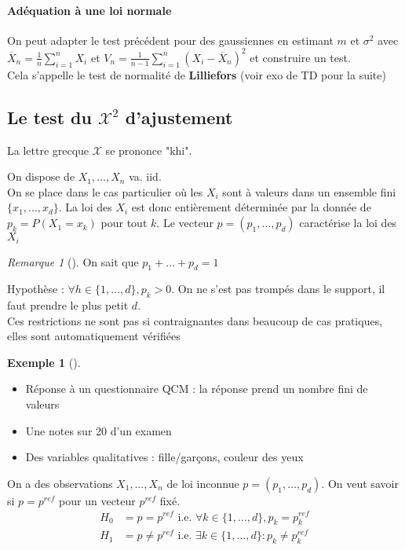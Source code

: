 \documentclass{article}
\theoremstyle{plain}%
\theoremstyle{definition}
\newtheorem{exmp}{Exemple}[section]
\theoremstyle{remark}
\newtheorem*{rem}{Remarque}
\begin{document}
\paragraph{Adéquation à une loi normale}
On peut adapter le test précédent pour des gaussiennes en estimant $ m $ et $ \sigma ^2 $ avec $ \overline{X}_n = \frac{1}{n}\sum_{i=1}^{n}X_i $ et $ V_n = \frac{1}{n-1} \sum_{i=1}^{n}(X_i - \overline{X}_n)^2 $ et construire un test. \\
Cela s'appelle le test de normalité de \textbf{Lilliefors} (voir exo de TD pour la suite)

\subsection{Le test du $ \mathcal{X}^2 $ d'ajustement}
La lettre grecque $ \mathcal{X} $ se prononce "khi". 

On dispose de $ X_1, \dots, X_n $ va. iid. \\
On se place dans le cas particulier où les $ X_i $ sont à valeurs dans un ensemble fini $ \{x_1, \dots, x_d\} $. La loi des $ X_i $ est donc entièrement déterminée par la donnée de $ p_k = P(X_1 = x_k) $ pour tout $ k $. Le vecteur $ p=(p_1, \dots, p_d) $ caractérise la loi des $ X_i $ 
\begin{rem}[]
    On sait que $ p_1 + \dots + p_d = 1 $
\end{rem}
Hypothèse : $ \forall h \in \{1,\dots,d\}, p_k > 0$. On ne s'est pas trompés dans le support, il faut prendre le plus petit $ d $. \\
Ces restrictions ne sont pas si contraignantes dans beaucoup de cas pratiques, elles sont automatiquement vérifiées

\begin{exmp}[]
    \begin{itemize}
        \item Réponse à un questionnaire QCM : la réponse prend un nombre fini de valeurs
        \item Une notes sur 20 d'un examen
        \item Des variables qualitatives : fille/garçons, couleur des yeux
    \end{itemize}
\end{exmp}

On a des observations $ X_1, \dots, X_n $ de loi inconnue $ p=(p_1, \dots, p_d) $. On veut savoir si $ p=p^{ref} $ pour un vecteur $ p^{ref} $ fixé. 
\begin{align*}
    H_0 &= p = p^{ref} \text{ i.e. } \forall k \in \{1,\dots,d\}, p_k = p_k^{ref} \\
    H_1 &= p \neq p^{ref} \text{ i.e. } \exists k \in \{1, \dots, d\}: p_k \neq p_k^{ref}
\end{align*}
\end{document}
